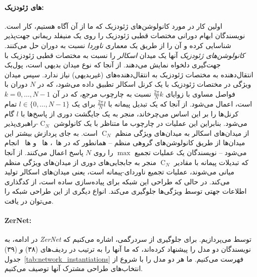 \paragraph{های ژئودزیک:}
اولین کار در مورد کانولوشن‌های ژئودزیک که ما از آن آگاه هستیم، کار \citet{masci2015geodesic} است.
نویسندگان ابهام دورانی مختصات قطبی ژئودزیک را روی یک منیفلد ریمانی جهت‌پذیر شناسایی کرده و آن را از طریق یک معماری \emph{ناوردا} نسبت به دوران حل می‌کنند.
\emph{کانولوشن‌های ژئودزیک} آنها یک میدان \emph{اسکالر} را نسبت به مختصات قطبی ژئودزیک با جهت‌گیری دلخواه نمایش می‌دهند.
از آنجا که نوع میدان بدیهی است، پول‌بک انتقال‌دهنده به مختصات ژئودزیک به انتقال‌دهنده‌های (غیربدیهی) نیاز ندارد.
سپس میدان ویژگی در مختصات ژئودزیک با یک کرنل اسکالر تطبیق داده می‌شود، که در $N$ دوران با فواصل مساوی با زوایای $\frac{2\pi}{N}k$ نسبت به چارچوب مرجع، که در آن $k=0,\dots,N-1$ است، اعمال می‌شود.
از آنجا که یک تبدیل پیمانه با $\frac{2\pi}{N}l$ برای یک $l\in\{0,\dots,N-1\}$ تمام کرنل‌ها را بر این اساس می‌چرخاند، منجر به یک جایگشت دوری از پاسخ‌ها با $l$ گام می‌شود.
بنابراین این عملیات در چارچوب ما متناظر با یک کانولوشن $\operatorname{C}_N$-راهبری‌پذیر از میدان‌های اسکالر به میدان‌های ویژگی منظم $\operatorname{C}_N$ است.
به جای پردازش بیشتر این میدان‌ها از طریق کانولوشن‌های گروهی منظم
-- همانطور که در ها~\cite{poulenard2018multi}، ها~\cite{Yang2020parallelFrameCNN} و ها~\cite{deHaan2020meshCNNs} انجام می‌شود --
نویسندگان یک عملیات تجمیع $\max$ را روی $N$ پاسخ اعمال می‌کنند.
از آنجا که تبدیلات پیمانه با مقادیر $\operatorname{C}_N$ منجر به جابجایی‌های دوری از میدان‌های ویژگی منظم میانی می‌شوند، عملیات تجمیع ناوردای-پیمانه است، یعنی میدان‌های اسکالر تولید می‌کند.
در حالی که طراحی این شبکه برای پیاده‌سازی ساده است، از کدگذاری اطلاعات جهتی توسط ویژگی‌ها جلوگیری می‌کند.
انواع دیگری از این طراحی شبکه را می‌توان در \cite{masci2015shapenet,monti2017geometric} یافت.







\paragraph{ZerNet:}
در ادامه، به \emph{ZerNet} توسط \citet{sun2018zernet} می‌پردازیم.
برای جلوگیری از سردرگمی، اشاره می‌کنیم که نویسندگان دو مدل را پیشنهاد کرده‌اند، که ما آنها را به ترتیب در ردیف‌های (۳۸) \emph{و} (۳۹) جدول~\ref{tab:network_instantiations} فهرست می‌کنیم.
ما هر دو مدل را با شروع از انتخاب‌های طراحی مشترک آنها توصیف می‌کنیم.

